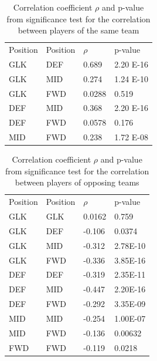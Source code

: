 \begin{table}[H]
\centering
\caption{Correlation coefficient $\rho$ and p-value from significance test for the correlation between players of the same team}
\label{tab:cor_team}
\begin{tabular}{llll}
Position & Position & $\rho$    & p-value  \\
GLK      & DEF      & 0.689  & 2.20 E-16 \\
GLK      & MID      & 0.274  & 1.24 E-10 \\
GLK      & FWD      & 0.0288 & 0.519    \\
DEF      & MID      & 0.368  & 2.20 E-16 \\
DEF      & FWD      & 0.0578 & 0.176    \\
MID      & FWD      & 0.238  & 1.72 E-08
\end{tabular}
\end{table}

\begin{table}[H]
\centering
\caption{Correlation coefficient $\rho$ and p-value from significance test for the correlation between players of opposing teams}
\label{tab:cor_opp}
\begin{tabular}{llll}
Position & Position & $\rho$    & p-value  \\
GLK      & GLK      & 0.0162 & 0.759    \\
GLK      & DEF      & -0.106 & 0.0374   \\
GLK      & MID      & -0.312 & 2.78E-10 \\
GLK      & FWD      & -0.336 & 3.85E-16 \\
DEF      & DEF      & -0.319 & 2.35E-11 \\
DEF      & MID      & -0.447 & 2.20E-16 \\
DEF      & FWD      & -0.292 & 3.35E-09 \\
MID      & MID      & -0.254 & 1.00E-07 \\
MID      & FWD      & -0.136 & 0.00632 \\
FWD      & FWD      & -0.119 & 0.0218  
\end{tabular}
\end{table}